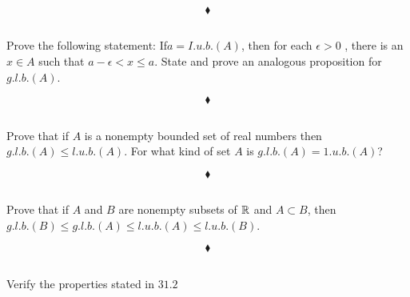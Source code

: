 $$\blacklozenge$$

\subsection{}
\begin{tcolorbox}
Prove the following statement: If$a = I.u.b. (A)$, then for each $\epsilon > 0$ , there is an $x \in  A$ such that $a-\epsilon < x \leq a$. State and prove an analogous proposition for $g.l.b. (A)$. 
\end{tcolorbox}

$$\blacklozenge$$

\subsection{}
\begin{tcolorbox}

Prove that if $A$ is a nonempty bounded set of real numbers then $g.l.b. (A) \leq l.u.b. (A)$. For what kind of set $A$ is $g.l.b. (A) =1.u.b. (A)$? 
\end{tcolorbox}

$$\blacklozenge$$



\subsection{}
\begin{tcolorbox}
Prove that if $A$ and $B$ are nonempty subsets of $\mathbb{R}$ and $A \subset B$, then $g.l.b. (B) \leq g.l.b. (A)\leq  l.u.b. (A) \leq l.u.b. (B)$.
\end{tcolorbox}

$$\blacklozenge$$
\newpage


\renewcommand{\thesubsection}{\thesection.\arabic{subsection}}
\setcounter{subsection}{0}
\subsection{}
\begin{tcolorbox}
Verify the properties stated in $\mathbf{31.2}$
\end{tcolorbox}

